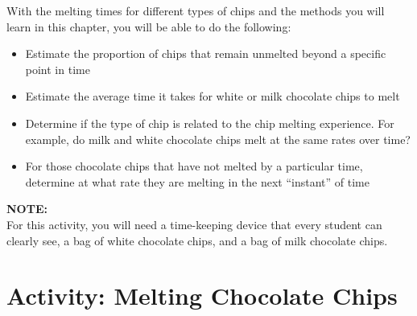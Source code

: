 \documentclass[
]{report}
\providecommand{\tightlist}{%
  \setlength{\itemsep}{0pt}\setlength{\parskip}{0pt}}
\begin{document}
With the melting times for different types of chips and the methods you will learn in this chapter, you will be able to do the following:

\begin{itemize}
\tightlist
\item
  Estimate the proportion of chips that remain unmelted beyond a specific point in time\\
\item
  Estimate the average time it takes for white or milk chocolate chips to melt\\
\item
  Determine if the type of chip is related to the chip melting experience. For example, do milk and white chocolate chips melt at the same rates over time?\\
\item
  For those chocolate chips that have not melted by a particular time, determine at what rate they are melting in the next ``instant'' of time
\end{itemize}

\large

\textbf{NOTE:}\\
For this activity, you will need a time-keeping device that every student can clearly see, a bag of white chocolate chips, and a bag of milk chocolate chips.\\
\normalsize

\section*{Activity: Melting Chocolate Chips}\label{activity-melting-chocolate-chips}
\end{document}
